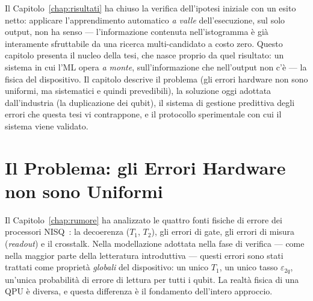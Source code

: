 \begin{onehalfspace}

Il Capitolo~\ref{chap:risultati} ha chiuso la verifica dell'ipotesi iniziale con un esito netto: applicare l'apprendimento automatico \emph{a valle} dell'esecuzione, sul solo output, non ha senso --- l'informazione contenuta nell'istogramma è già interamente sfruttabile da una ricerca multi-candidato a costo zero. Questo capitolo presenta il nucleo della tesi, che nasce proprio da quel risultato: un sistema in cui l'\ac{ML} opera \emph{a monte}, sull'informazione che nell'output non c'è --- la fisica del dispositivo. Il capitolo descrive il problema (gli errori hardware non sono uniformi, ma sistematici e quindi prevedibili), la soluzione oggi adottata dall'industria (la duplicazione dei qubit), il sistema di gestione predittiva degli errori che questa tesi vi contrappone, e il protocollo sperimentale con cui il sistema viene validato.

\section{Il Problema: gli Errori Hardware non sono Uniformi}
\label{sec:errori_non_uniformi}

Il Capitolo~\ref{chap:rumore} ha analizzato le quattro fonti fisiche di errore dei processori \ac{NISQ}~\cite{preskill2018}: la decoerenza ($T_1$, $T_2$), gli errori di gate, gli errori di misura (\textit{readout}) e il crosstalk. Nella modellazione adottata nella fase di verifica --- come nella maggior parte della letteratura introduttiva --- questi errori sono stati trattati come proprietà \emph{globali} del dispositivo: un unico $T_1$, un unico tasso $\varepsilon_{2q}$, un'unica probabilità di errore di lettura per tutti i qubit. La realtà fisica di una \ac{QPU} è diversa, e questa differenza è il fondamento dell'intero approccio.


\end{onehalfspace}
